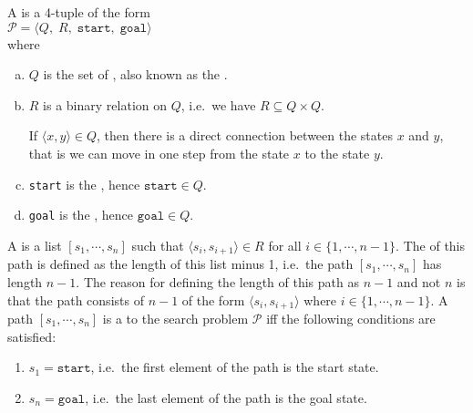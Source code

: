\begin{Definition}
  A   is a 4-tuple of the form
  \\[0.2cm]
  \hspace*{1.3cm}
  $\mathcal{P} = \langle Q,\;R,\; \mathtt{start},\; \mathtt{goal}\rangle$
  \\[0.2cm]
  where
  \begin{enumerate}[(a)]
  \item $Q$ is the set of , also known as the .
  \item $R$ is a binary relation on $Q$, i.e.~we have $R \subseteq Q \times Q$.

        If $\langle x, y \rangle \in Q$, then there is a direct connection between the states $x$ and $y$,
        that is we can move in one step from the state $x$ to the state $y$.
  \item \texttt{start} is the , hence $\mathtt{start} \in Q$.
  \item \texttt{goal} is the , hence $\mathtt{goal} \in Q$.    
  \end{enumerate}
  A   is a list $[s_1, \cdots, s_n]$ such that $\langle s_{i}, s_{i+1} \rangle \in R$
  for all $i \in \{1,\cdots,n-1\}$.  The  of this path is defined as the length of this list minus
  1, i.e.~the path $[s_1, \cdots, s_n]$ has length $n-1$.  The reason for defining the length of this path as
  $n-1$ and not $n$ is that the path consists of $n-1$   of the form $\langle s_i, s_{i+1} \rangle$ where
  $i \in \{1, \cdots, n-1\}$.
  A path $[s_1, \cdots, s_n]$ is a  to the search problem $\mathcal{P}$ iff the following conditions are satisfied:
  \begin{enumerate}
  \item $s_1 = \mathtt{start}$, i.e.~the first element of the path is the start state.
  \item $s_n = \mathtt{goal}$, i.e.~the last element of the path is the goal state. \eox
  \end{enumerate}
\end{Definition}

